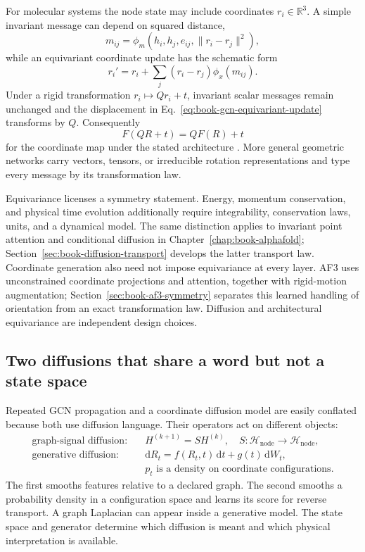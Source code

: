 For molecular systems the node state may include coordinates $r_i\in\mathbb R^3$.  A simple
invariant message can depend on squared distance,
\begin{equation}
m_{ij}=\phi_m(h_i,h_j,e_{ij},\|r_i-r_j\|^2),
\end{equation}
while an equivariant coordinate update has the schematic form
\begin{equation}
r_i'=r_i+\sum_j(r_i-r_j)\phi_x(m_{ij}).
\label{eq:book-gcn-equivariant-update}
\end{equation}
Under a rigid transformation $r_i\mapsto Qr_i+t$, invariant scalar messages remain unchanged and
the displacement in Eq.~\ref{eq:book-gcn-equivariant-update} transforms by $Q$.  Consequently
\begin{equation}
F(QR+t)=QF(R)+t
\label{eq:book-gcn-equivariance-law}
\end{equation}
for the coordinate map under the stated architecture \cite{satorras2021}.  More general geometric
networks carry vectors, tensors, or irreducible rotation representations and type every message by
its transformation law.

Equivariance licenses a symmetry statement.  Energy, momentum conservation, and physical time
evolution additionally require integrability, conservation laws, units, and a dynamical model.
The same distinction applies to invariant point attention and conditional diffusion in
Chapter~\ref{chap:book-alphafold}; Section~\ref{sec:book-diffusion-transport} develops the latter
transport law.  Coordinate generation also need not impose equivariance at every layer.  AF3
uses unconstrained coordinate projections and attention, together with rigid-motion augmentation;
Section~\ref{sec:book-af3-symmetry} separates this learned handling of orientation from an exact
transformation law.  Diffusion and architectural equivariance are independent design choices.

\subsection{Two diffusions that share a word but not a state space}

Repeated GCN propagation and a coordinate diffusion model are easily conflated because both use
diffusion language.  Their operators act on different objects:
\begin{equation}
\begin{aligned}
\text{graph-signal diffusion:}&\quad
H^{(k+1)}=SH^{(k)},
\quad S:\mathcal H_{\mathrm{node}}\to\mathcal H_{\mathrm{node}},\\
\text{generative diffusion:}&\quad
\mathrm dR_t=f(R_t,t)\,\mathrm dt+g(t)\,\mathrm dW_t,\\
&\quad p_t\text{ is a density on coordinate configurations}.
\end{aligned}
\label{eq:book-gcn-two-diffusions}
\end{equation}
The first smooths features relative to a declared graph.  The second smooths a probability density
in a configuration space and learns its score for reverse transport.  A graph Laplacian can appear
inside a generative model.  The state space and generator determine which diffusion is meant and
which physical interpretation is available.

